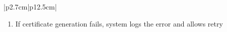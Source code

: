 \begin{table}[H]
\begin{tabular}{|p{2.7cm}|p{12.5cm}|}
\begin{minipage}[t]{\linewidth}
\begin{enumerate}[topsep=0pt,itemsep=1pt,parsep=0pt,partopsep=0pt]
                                                    items and blocks certificate generation
                                              \item If certificate generation fails, system logs the error and allows retry
                                          \end{enumerate}
                                      \end{minipage}                                                                                     \\
            \hline
        \end{tabular}
        \label{tab:eng-assessment-completion}
    \end{table}

